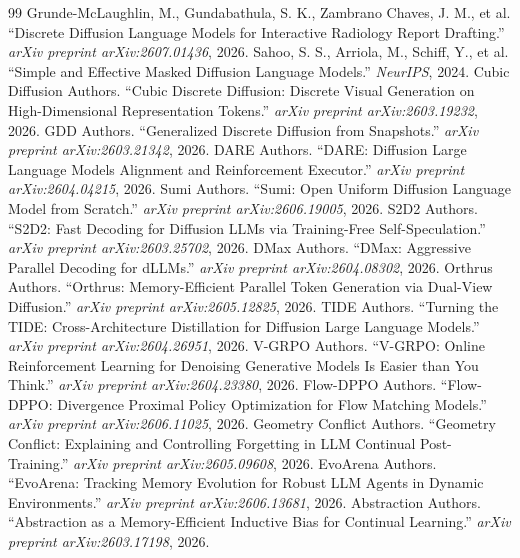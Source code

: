 \documentclass[11pt,a4paper]{article}
\begin{document}
\begin{thebibliography}{99}
 Grunde-McLaughlin, M., Gundabathula, S. K., Zambrano Chaves, J. M., et al. ``Discrete Diffusion Language Models for Interactive Radiology Report Drafting.'' \emph{arXiv preprint arXiv:2607.01436}, 2026.
 Sahoo, S. S., Arriola, M., Schiff, Y., et al. ``Simple and Effective Masked Diffusion Language Models.'' \emph{NeurIPS}, 2024.
 Cubic Diffusion Authors. ``Cubic Discrete Diffusion: Discrete Visual Generation on High-Dimensional Representation Tokens.'' \emph{arXiv preprint arXiv:2603.19232}, 2026.
 GDD Authors. ``Generalized Discrete Diffusion from Snapshots.'' \emph{arXiv preprint arXiv:2603.21342}, 2026.
 DARE Authors. ``DARE: Diffusion Large Language Models Alignment and Reinforcement Executor.'' \emph{arXiv preprint arXiv:2604.04215}, 2026.
 Sumi Authors. ``Sumi: Open Uniform Diffusion Language Model from Scratch.'' \emph{arXiv preprint arXiv:2606.19005}, 2026.
 S2D2 Authors. ``S2D2: Fast Decoding for Diffusion LLMs via Training-Free Self-Speculation.'' \emph{arXiv preprint arXiv:2603.25702}, 2026.
 DMax Authors. ``DMax: Aggressive Parallel Decoding for dLLMs.'' \emph{arXiv preprint arXiv:2604.08302}, 2026.
 Orthrus Authors. ``Orthrus: Memory-Efficient Parallel Token Generation via Dual-View Diffusion.'' \emph{arXiv preprint arXiv:2605.12825}, 2026.
 TIDE Authors. ``Turning the TIDE: Cross-Architecture Distillation for Diffusion Large Language Models.'' \emph{arXiv preprint arXiv:2604.26951}, 2026.
 V-GRPO Authors. ``V-GRPO: Online Reinforcement Learning for Denoising Generative Models Is Easier than You Think.'' \emph{arXiv preprint arXiv:2604.23380}, 2026.
 Flow-DPPO Authors. ``Flow-DPPO: Divergence Proximal Policy Optimization for Flow Matching Models.'' \emph{arXiv preprint arXiv:2606.11025}, 2026.
 Geometry Conflict Authors. ``Geometry Conflict: Explaining and Controlling Forgetting in LLM Continual Post-Training.'' \emph{arXiv preprint arXiv:2605.09608}, 2026.
 EvoArena Authors. ``EvoArena: Tracking Memory Evolution for Robust LLM Agents in Dynamic Environments.'' \emph{arXiv preprint arXiv:2606.13681}, 2026.
 Abstraction Authors. ``Abstraction as a Memory-Efficient Inductive Bias for Continual Learning.'' \emph{arXiv preprint arXiv:2603.17198}, 2026.
\end{thebibliography}
\end{document}
